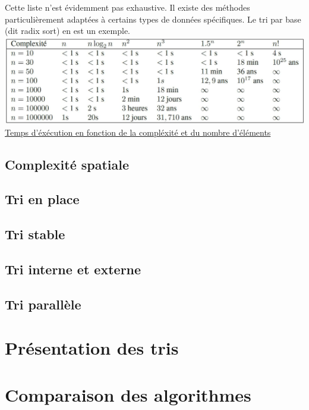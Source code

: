 \documentclass[11pt,a4paper]{article}
\begin{document}
\begin{itemize}
          Cette liste n’est évidemment pas exhaustive. Il existe des méthodes particulièrement adaptées à certains types de données spécifiques. Le tri par base (dit radix sort) en est un exemple.
          \newline
          \newline
          \includegraphics[scale = 0.5]{O(n).jpg}
          \underline {Temps d'éxécution en fonction de la compléxité et du nombre d'éléments}


\end{itemize}

\subsection{Complexité spatiale}

\subsection{Tri en place}

\subsection{Tri stable}

\subsection{Tri interne et externe}

\subsection{Tri parallèle}

\section{Présentation des tris}

\section{Comparaison des algorithmes}
\end{document}
